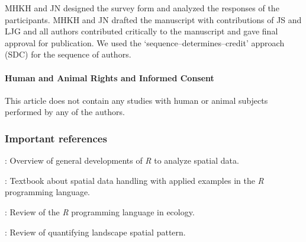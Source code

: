 \documentclass[smallextended]{svjour3}       %
\begin{document}
MHKH and JN designed the survey form and analyzed the responses of the participants.
MHKH and JN drafted the manuscript with contributions of JS and LJG and all authors contributed critically to the manuscript and gave final approval for publication.
We used the `sequence--determines--credit' approach (SDC) for the sequence of authors.

\hypertarget{human-and-animal-rights-and-informed-consent}{%
\paragraph{Human and Animal Rights and Informed Consent}\label{human-and-animal-rights-and-informed-consent}}

This article does not contain any studies with human or animal subjects performed by any of the authors.

\hypertarget{important-references}{%
\subsubsection{Important references}\label{important-references}}

\noindent \textbullet \textbullet \cite{Bivand2020}: Overview of general developments of \emph{R} to analyze spatial data.

\noindent \textbullet \textbullet \cite{Lovelace2019}: Textbook about spatial data handling with applied examples in the \emph{R} programming language.

\noindent \textbullet \cite{Lai2019}: Review of the \emph{R} programming language in ecology.

\noindent \textbullet \cite{Gustafson2019}: Review of quantifying landscape spatial pattern.




\end{document}
